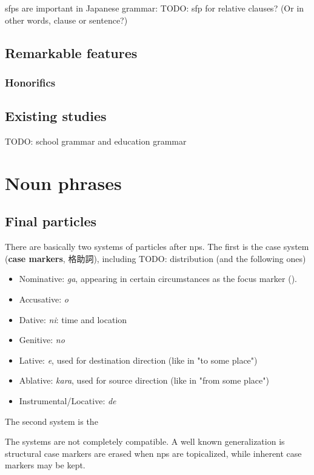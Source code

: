 \documentclass[UTF8, a4paper, oneside, scheme=plain]{ctexart}
\newcommand*{\concept}[1]{\textbf{#1}}
\newcommand{\corpus}[1]{\emph{#1}}
\begin{document}
\acs{sfp}s are important in Japanese grammar:
TODO: sfp for relative clauses? (Or in other words, clause or sentence?)

\subsection{Remarkable features}

\subsubsection{Honorifics}

\subsection{Existing studies}

TODO: school grammar and education grammar

\section{Noun phrases}

\subsection{Final particles}

There are basically two systems of particles after \ac{np}s.
The first is the case system (\concept{case markers}, 格助詞), including
TODO: distribution (and the following ones)
\begin{itemize}
    \item Nominative: \corpus{ga}, 
    appearing in certain circumstances as the focus marker ().
    \item Accusative: \corpus{o}
    \item Dative: \corpus{ni}: time and location 
    \item Genitive: \corpus{no} 
    \item Lative: \corpus{e}, used for destination direction (like in "to some place")
    \item Ablative: \corpus{kara}, used for source direction (like in "from some place")
    \item Instrumental/Locative: \corpus{de}
\end{itemize}

The second system is the 

The systems are not completely compatible.
A well known generalization is structural case markers are erased when \ac{np}s are topicalized,
while inherent case markers may be kept.
\end{document}
